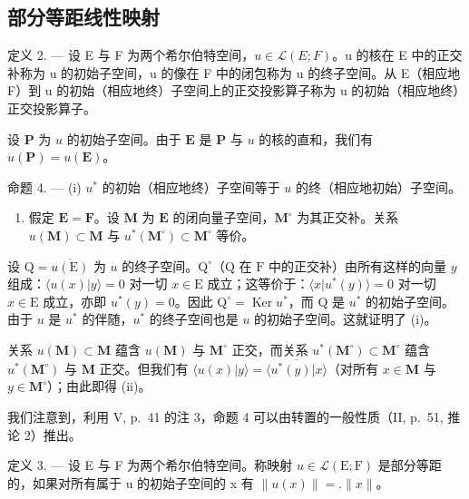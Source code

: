 \subsection{部分等距线性映射}

定义 2. --- 设 E 与 F 为两个希尔伯特空间，\(u \in \mathcal{L}(E; F)\)。u 的核在 E 中的正交补称为 u 的初始子空间，u 的像在 F 中的闭包称为 u 的终子空间。从 E（相应地 F）到 u 的初始（相应地终）子空间上的正交投影算子称为 u 的初始（相应地终）正交投影算子。

设 \(\mathbf{P}\) 为 \(u\) 的初始子空间。由于 \(\mathbf{E}\) 是 \(\mathbf{P}\) 与 \(u\) 的核的直和，我们有 \(u(\mathbf{P}) = u(\mathbf{E})\)。

命题 4. --- (i) \(u^*\) 的初始（相应地终）子空间等于 \(u\) 的终（相应地初始）子空间。

\begin{enumerate}
\def\labelenumi{(\roman{enumi})}
\setcounter{enumi}{1}
\tightlist
\item
  假定 \(\mathbf{E} = \mathbf{F}\)。设 \(\mathbf{M}\) 为 \(\mathbf{E}\) 的闭向量子空间，\(\mathbf{M}^{\circ}\) 为其正交补。关系 \(u(\mathbf{M}) \subset \mathbf{M}\) 与 \(u^{*}(\mathbf{M}^{\circ}) \subset \mathbf{M}^{\circ}\) 等价。
\end{enumerate}

设 \(\mathrm{Q} = \overline{u(\mathrm{E})}\) 为 \(u\) 的终子空间。\(\mathrm{Q}^{\circ}\)（\(\mathrm{Q}\) 在 \(\mathrm{F}\) 中的正交补）由所有这样的向量 \(y\) 组成：\(\langle u(x)|y\rangle = 0\) 对一切 \(x\in \mathrm{E}\) 成立；这等价于：\(\langle x|u^{*}(y)\rangle = 0\) 对一切 \(x\in \mathrm{E}\) 成立，亦即 \(u^{*}(y) = 0\)。因此 \(\mathrm{Q}^{\circ} = \operatorname{Ker}u^{*}\)，而 \(\mathrm{Q}\) 是 \(u^{*}\) 的初始子空间。由于 \(u\) 是 \(u^{*}\) 的伴随，\(u^{*}\) 的终子空间也是 \(u\) 的初始子空间。这就证明了 (i)。

关系 \(u(\mathbf{M}) \subset \mathbf{M}\) 蕴含 \(u(\mathbf{M})\) 与 \(\mathbf{M}^{\circ}\) 正交，而关系 \(u^{*}(\mathbf{M}^{\circ}) \subset \mathbf{M}^{\circ}\) 蕴含 \(u^{*}(\mathbf{M}^{\circ})\) 与 \(\mathbf{M}\) 正交。但我们有 \(\langle u(x)|y\rangle = \overline{\langle u^{*}(y)|x\rangle}\)（对所有 \(x \in \mathbf{M}\) 与 \(y \in \mathbf{M}^{\circ}\)）；由此即得 (ii)。

我们注意到，利用 V, p.~41 的注 3，命题 4 可以由转置的一般性质（II, p.~51, 推论 2）推出。

定义 3. --- 设 E 与 F 为两个希尔伯特空间。称映射 \(u \in \mathcal{L}(\mathrm{E};\mathrm{F})\) 是部分等距的，如果对所有属于 u 的初始子空间的 x 有 \(\|u(x)\| = .\|x\|\)。

